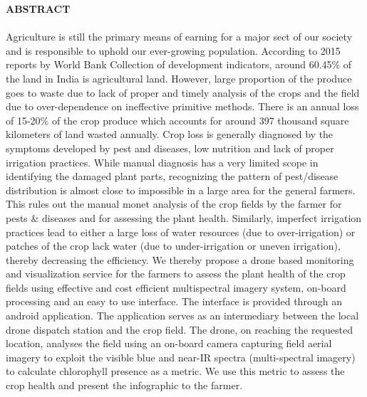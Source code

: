 \begin{center}
\thispagestyle{empty}
\vspace{2cm}
\LARGE{\textbf{ABSTRACT}}\\[1.0cm]
\end{center}
\thispagestyle{empty}
\large{\paragraph{}
Agriculture is still the primary means of earning for a major sect of our society and is responsible to uphold our ever-growing population. According to 2015 reports by World Bank Collection of development indicators, around 60.45\% of the land in India is agricultural land. However, large proportion of the produce goes to waste due to lack of proper and timely analysis of the crops and the field due to over-dependence on ineffective primitive methods. There is an annual loss of 15-20\% of the crop produce which accounts for around 397 thousand square kilometers of land wasted annually. Crop loss is generally diagnosed by the symptoms developed by pest and diseases, low nutrition and lack of proper irrigation practices. While manual diagnosis has a very limited scope in identifying the damaged plant parts, recognizing the pattern of pest/disease distribution is almost close to impossible in a large area for the general farmers. This rules out the manual monet analysis of the crop fields by the farmer for pests \& diseases and for assessing the plant health. Similarly, imperfect irrigation practices lead to either a large loss of water resources (due to over-irrigation) or patches of the crop lack water (due to under-irrigation or uneven irrigation), thereby decreasing the efficiency. 
We thereby propose a drone based monitoring and visualization service for the farmers to assess the plant health of the crop fields using effective and cost efficient multispectral imagery system, on-board processing and an easy to use interface. The interface is provided through an android application. The application serves as an intermediary between the local drone dispatch station and the crop field. The drone, on reaching the requested location, analyses the field using an on-board camera capturing field aerial imagery to exploit the visible blue and near-IR spectra (multi-spectral imagery) to calculate chlorophyll presence as a metric. We use this metric to assess the crop health and present the infographic to the farmer.
%
}
